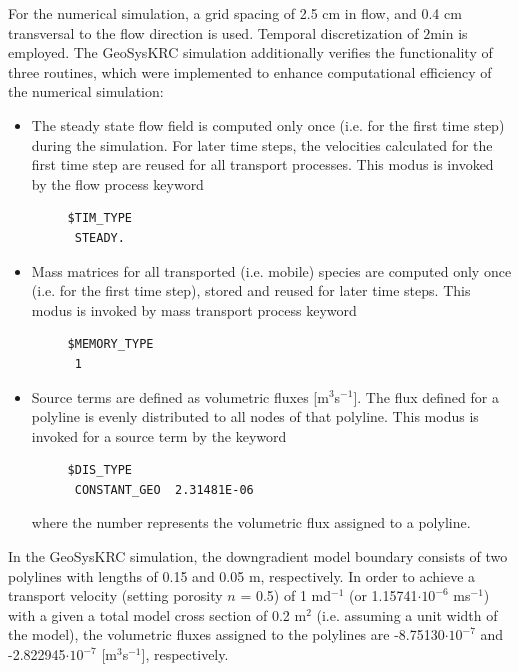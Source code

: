 For the numerical simulation, a grid spacing of 2.5 cm in flow, and 0.4 cm
transversal to the flow direction is used. Temporal discretization of $2\mathrm{min}$ is employed. The GeoSysKRC simulation additionally verifies the functionality of three routines, which were implemented to enhance computational efficiency of the numerical simulation:
\begin{itemize}
 \item The steady state flow field is computed only once (i.e. for the first time step) during the simulation. For later time steps, the velocities calculated for the first time step are reused for all transport processes. This modus is invoked by the flow process keyword
     \small \begin{verbatim}
     $TIM_TYPE
      STEADY.
     \end{verbatim} \normalsize
\item  Mass matrices for all transported (i.e. mobile) species are computed only once (i.e. for the first time step), stored and reused for later time steps. This modus is invoked by mass transport process keyword
     \small \begin{verbatim}
     $MEMORY_TYPE
      1
     \end{verbatim} \normalsize
\item  Source terms are defined as volumetric fluxes [m$^3$s$^{-1}$]. The flux defined for a polyline is evenly distributed to all nodes of that polyline. This modus is invoked for a source term by the keyword
     \small \begin{verbatim}
     $DIS_TYPE
      CONSTANT_GEO  2.31481E-06
     \end{verbatim} \normalsize
     where the number represents the volumetric flux assigned to a polyline.
\end{itemize}
In the GeoSysKRC simulation, the downgradient model boundary consists of two polylines with lengths of 0.15 and 0.05 m, respectively. In order to achieve a transport velocity (setting porosity $n$ = 0.5) of 1 md$^{-1}$ (or 1.15741$\cdot10^{-6}$ ms$^{-1}$) with a given a total model cross section of 0.2 m$^2$ (i.e. assuming a unit width of the model), the volumetric fluxes assigned to the polylines are -8.75130$\cdot10^{-7}$ and -2.822945$\cdot10^{-7}$ [m$^3$s$^{-1}$], respectively.



